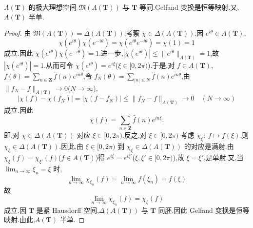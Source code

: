 \begin{theorem}\label{thm:3.2.2}
$A(\mathbf{T})$ 的极大理想空间 $\mathfrak{M}(A(\mathbf{T}))$ 与 $\mathbf{T}$ 等同.Gelfand 变换是恒等映射.又,$A(\mathbf{T})$ 半单.
\end{theorem}

\begin{proof}
由 $\mathfrak{M}(A(\mathbf{T})) = \Delta(A(\mathbf{T}))$,考察 $\chi \in \Delta(A(\mathbf{T}))$.因 $e^{i\theta} \in A(\mathbf{T})$,
\begin{equation*}
\chi(e^{i\theta})\chi(e^{-i\theta}) = \chi(e^{i\theta}e^{-i\theta}) = \chi(1) = 1
\end{equation*}
成立.因此 $\chi(e^{i\theta})\chi(e^{-i\theta}) = 1$.进一步,$|\chi(e^{i\theta})| \leq \|e^{i\theta}\|_{A(\mathbf{T})} = 1$,故 $|\chi(e^{i\theta})| = 1$.从而可令 $\chi(e^{i\theta}) = e^{i\xi}$($\xi \in [0, 2\pi)$).于是,对 $f \in A(\mathbf{T})$,$f(\theta) = \sum_{n \in \mathbf{Z}}\hat{f}(n)e^{in\theta}$,令 $f_{N}(\theta) = \sum_{|n| \leq N}\hat{f}(n)e^{in\theta}$,由 $\|f_{N} - f\|_{A(\mathbf{T})} \to 0$($N \to \infty$),
\begin{equation*}
|\chi(f) - \chi(f_{N})| = |\chi(f - f_{N})| \leq \|f_{N} - f\|_{A(\mathbf{T})} \to 0 \quad (N \to \infty)
\end{equation*}
成立.因此
\begin{equation*}
\chi(f) = \sum_{n \in \mathbf{Z}}\hat{f}(n)e^{in\xi}.
\end{equation*}
即,对 $\chi \in \Delta(A(\mathbf{T}))$ 对应 $\xi \in [0, 2\pi)$.反之,对 $\xi \in [0, 2\pi)$ 考虑 $\chi_{\xi}:\ f \mapsto f(\xi)$,则 $\chi_{\xi} \in \Delta(A(\mathbf{T}))$.因此,由 $\xi \in [0, 2\pi)$ 到 $\chi_{\xi} \in \Delta(A(\mathbf{T}))$ 的对应是满射.由 $\chi_{\xi}(f) = \chi_{\xi'}(f)$($f \in A(\mathbf{T})$)得 $e^{i\xi} = e^{i\xi'}$($\xi, \xi' \in [0, 2\pi)$),故 $\xi = \xi'$,是单射.又,当 $\lim_{n \to \infty}\xi_{n} = \xi$ 时,
\begin{equation*}
\lim_{n \to \infty}\chi_{\xi_{n}}(f) = \lim_{n \to \infty}f(\xi_{n}) = f(\xi)
\end{equation*}
故
\begin{equation*}
\lim_{n \to \infty}\chi_{\xi_{n}}(f) = \chi_{\xi}(f)
\end{equation*}
成立.因 $\mathbf{T}$ 是紧 Hausdorff 空间,$\Delta(A(\mathbf{T}))$ 与 $\mathbf{T}$ 同胚.因此 Gelfand 变换是恒等映射.由此,$A(\mathbf{T})$ 半单.
\end{proof}

